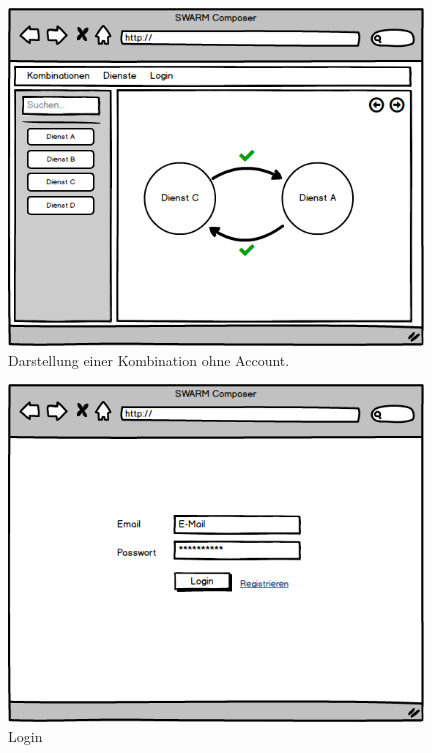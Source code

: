 \begin{figure}[ht]
	\centering
	\includegraphics[keepaspectratio,width=11cm]{img/webfrontend/Kombinationen_Detail_Anonym.png}
	\caption{Darstellung einer Kombination ohne Account.}
\end{figure}

\begin{figure}[ht]
	\centering
	\includegraphics[keepaspectratio,width=11cm]{img/webfrontend/Login.png}
	\caption{Login}
\end{figure}

